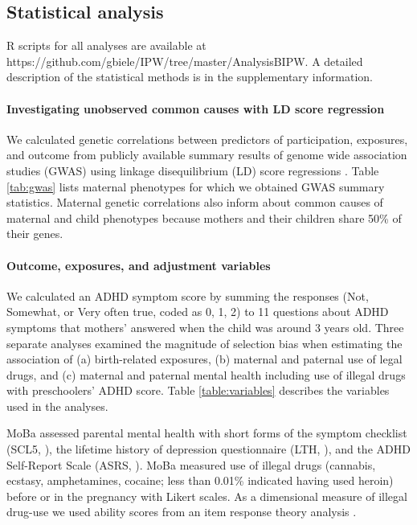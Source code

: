 \documentclass[12pt]{article}
\begin{document}
\subsection{Statistical analysis}
R scripts for all analyses are available at {\footnotesize https://github.com/gbiele/IPW/tree/master/AnalysisBIPW}. A detailed description of the statistical methods is in the supplementary information.

\paragraph{Investigating unobserved common causes with LD score regression} We calculated genetic correlations between predictors of participation, exposures, and outcome from publicly available summary results of genome wide association studies (GWAS) using linkage disequilibrium (LD) score regressions \cite{Bulik-Sullivan2015-er}. Table \ref{tab:gwas} lists maternal phenotypes for which we obtained GWAS summary statistics. Maternal genetic correlations also inform about common causes of maternal and child phenotypes because mothers and their children share 50\% of their genes.

\paragraph{Outcome, exposures, and adjustment variables} We calculated an ADHD symptom score by summing the responses (Not, Somewhat, or Very often true, coded as 0, 1, 2) to 11 questions about ADHD symptoms that mothers' answered when the child was around 3 years old. Three separate analyses examined the magnitude of selection bias when estimating the association of (a) birth-related exposures, (b) maternal and paternal use of legal drugs, and (c) maternal and paternal mental health including use of illegal drugs with preschoolers' ADHD score. Table \ref{table:variables} describes the variables used in the analyses. 

MoBa assessed parental mental health with short forms of the symptom checklist (SCL5, \cite{Tambs1993-ch}), the lifetime history of depression questionnaire (LTH, \cite{Kendler1993-pf}), and the ADHD Self-Report Scale (ASRS, \cite{Kessler2007-et}). MoBa measured use of illegal drugs (cannabis, ecstasy, amphetamines, cocaine; less than 0.01\% indicated  having used heroin) before or in the pregnancy with Likert scales. As a dimensional measure of illegal drug-use we used ability scores from an item response theory analysis \cite{Rizopoulos2006-bc}. 
\end{document}
